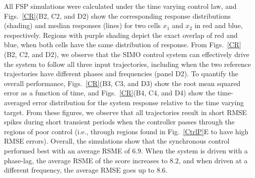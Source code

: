 \documentclass[12pt]{iopart}
\begin{document}
All FSP simulations were calculated under the time varying control law, and Figs.\ \ref{CR}(B2, C2, and D2) show the corresponding response distributions (shading) and median responses (lines) for two cells $x_1$ and $x_2$ in red and blue, respectively. 
Regions with purple shading depict the exact overlap of red and blue, when both cells have the same distribution of response. 
From Figs.\ \ref{CR}(B2, C2, and D2), we observe that the SIMO control system can effectively drive the system to follow all three input trajectories, including when the two reference trajectories have different phases and frequencies (panel D2). 
To quantify the overall performance, Figs.\ \ref{CR}(B3, C3, and D3) show the root mean squared error as a function of time, and Figs.\ \ref{CR}(B4, C4, and D4) show the time-averaged error distribution for the system response relative to the time varying target. 
From these figures, we observe that all trajectories result in short RMSE spikes during short transient periods when the controller passes through the regions of poor control (i.e., through regions found in Fig.\ \ref{CtrlP}E to have high RMSE errors). Overall, the simulations show that the synchronous control performed best with an average RSME of $6.9$. When the system is driven with a phase-lag, the average RSME of the score increases to $8.2$, and when driven at a different frequency, the average RMSE goes up to $8.6$.  
\end{document}
